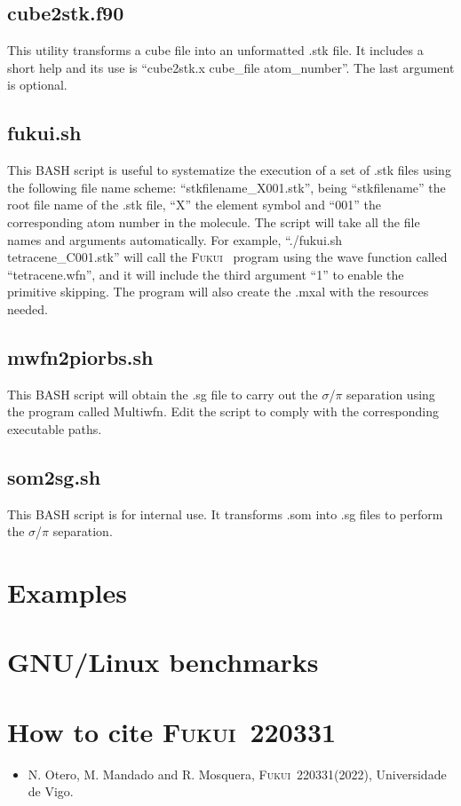 \documentclass[a4paper,11pt,openany]{memoir}
\newcommand\versionprog{220331}
\newcommand\programa{\textsc{Fukui}}
\begin{document}
\section{cube2stk.f90}
This utility transforms a cube file into an unformatted .stk file. It includes a short help and its use is ``cube2stk.x cube\_file atom\_number''. The last argument is optional.

\section{fukui.sh}
This BASH script is useful to systematize the execution of a set of .stk files using the following file name scheme: ``stkfilename\_X001.stk'', being ``stkfilename'' the root file name of the .stk file, ``X'' the element symbol and ``001'' the corresponding atom number in the molecule. The script will take all the file names and arguments automatically. For example, ``./fukui.sh tetracene\_C001.stk'' will call the \programa~ program using the wave function called ``tetracene.wfn'', and it will include the third argument ``1'' to enable the primitive skipping. The program will also create the .mxal with the resources needed.

\section{mwfn2piorbs.sh}
This BASH script will obtain the .sg file to carry out the $\sigma$/$\pi$ separation using the program called Multiwfn. Edit the script to comply with the corresponding executable paths.

\section{som2sg.sh}
This BASH script is for internal use. It transforms .som into .sg files to perform the $\sigma$/$\pi$ separation.

\chapter{Examples}

\chapter{GNU/Linux benchmarks}

\chapter{How to cite \textsc{\programa~\versionprog}}
\begin{itemize}
	\item N. Otero, M. Mandado and R. Mosquera, \programa~\versionprog (2022), Universidade de Vigo.
\end{itemize}
\end{document}
